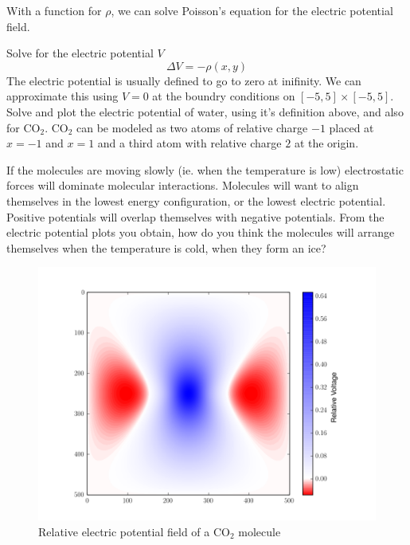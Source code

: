 With a function for $\rho$, we can solve Poisson's equation for the electric potential field.
\begin{problem}
Solve for the electric potential $V$
\[
		\Delta V = -\rho(x,y) 
\]
The electric potential is usually defined to go to zero at inifinity.
We can approximate this using $V=0$ at the boundry conditions on $[-5,5]\times [-5,5]$.
Solve and plot the electric potential of water, using it's definition above, and also for CO$_2$.
CO$_2$ can be modeled as two atoms of relative charge $-1$ placed at $x=-1$ and $x=1$ and a third atom with relative charge $2$ at the origin. 

If the molecules are moving slowly (ie. when the temperature is low) electrostatic forces will dominate molecular interactions. 
Molecules will want to align themselves in the lowest energy configuration, or the lowest electric potential. 
Positive potentials will overlap themselves with negative potentials. 
From the electric potential plots you obtain, how do you think the molecules will arrange themselves when the temperature is cold, when they form an ice?

\end{problem}
\begin{figure}[ht]
\centering
\includegraphics[width=12cm]{co2V.png}
\caption{Relative electric potential field of a CO$_2$ molecule}
\label{figure4}
\end{figure}
